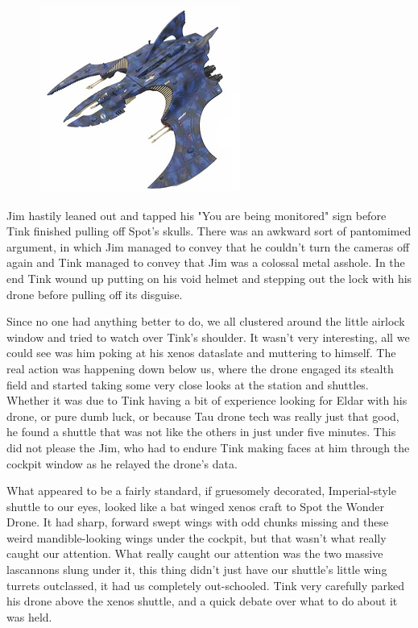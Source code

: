 \begin{figure}
	\begin{center}
		\includegraphics[width=\figwidth]{pics/11/47.png}
	\end{center}
\end{figure}
Jim hastily leaned out and tapped his "You are being monitored" sign before Tink finished pulling off Spot's skulls. 
There was an awkward sort of pantomimed argument, in which Jim managed to convey that he couldn't turn the cameras off again and Tink managed to convey that Jim was a colossal metal asshole. 
In the end Tink wound up putting on his void helmet and stepping out the lock with his drone before pulling off its disguise.
 
Since no one had anything better to do, we all clustered around the little airlock window and tried to watch over Tink's shoulder. 
It wasn't very interesting, all we could see was him poking at his xenos dataslate and muttering to himself. 
The real action was happening down below us, where the drone engaged its stealth field and started taking some very close looks at the station and shuttles. 
Whether it was due to Tink having a bit of experience looking for Eldar with his drone, or pure dumb luck, or because Tau drone tech was really just that good, he found a shuttle that was not like the others in just under five minutes. 
This did not please the Jim, who had to endure Tink making faces at him through the cockpit window as he relayed the drone's data.
 
What appeared to be a fairly standard, if gruesomely decorated, Imperial-style shuttle to our eyes, looked like a bat winged xenos craft to Spot the Wonder Drone. 
It had sharp, forward swept wings with odd chunks missing and these weird mandible-looking wings under the cockpit, but that wasn’t what really caught our attention. 
What really caught our attention was the two massive lascannons slung under it, this thing didn’t just have our shuttle’s little wing turrets outclassed, it had us completely out-schooled. 
Tink very carefully parked his drone above the xenos shuttle, and a quick debate over what to do about it was held.
 
